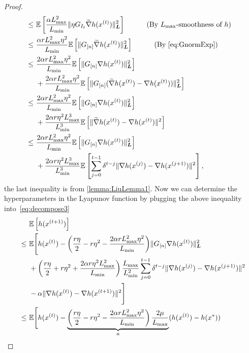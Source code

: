 \begin{proof}
\begin{align*}
        ~\leq~&  \mathbb{E} \left[ \frac{\alpha L_{\max}^2}{L_{\min}} \| \eta G_{I_t} \widetilde{\nabla} h( x^{(t)} )  \|_{\boldsymbol{L}}^2 \right]  \qquad \hbox{\quad(By $L_{\max}$-smoothness of $h$)\quad}  \\
        ~\leq~& \frac{\alpha r L_{\max}^2 \eta^2}{L_{\min}} \mathbb{E} \left[  \| G_{[n]} \widetilde{\nabla} h( x^{(t)} )  \|_{\boldsymbol{L}}^2 \right] \qquad \hbox{\quad(By \eqref{eq:GnormExp})\quad} \\
        ~\leq~&  \frac{2 \alpha r L_{\max}^2 \eta^2}{L_{\min}} \mathbb{E} \left[ \| G_{[n]} \nabla h( x^{(t)} ) \|^2_{\boldsymbol{L}} \right] \\
        &+ \frac{2 \alpha r L_{\max}^2 \eta^2}{L_{\min}} \mathbb{E} \left[  \| G_{[n]} ( \widetilde{\nabla} h( x^{(t)} ) - \nabla h( x^{(t)} ) ) \|^2_{\boldsymbol{L}}  \right] \\
        ~\leq~&  \frac{2 \alpha r L_{\max}^2 \eta^2}{L_{\min}} \mathbb{E} \left[ \| G_{[n]} \nabla h( x^{(t)} ) \|^2_{\boldsymbol{L}} \right] \\
        &+ \frac{2 \alpha r \eta^2 L_{\max}^3}{ L_{\min}^3 } \mathbb{E} \left[  \| \widetilde{\nabla} h( x^{(t)} ) - \nabla h( x^{(t)} ) \|^2  \right] \\
        ~\leq~& \frac{2 \alpha r L_{\max}^2 \eta^2}{L_{\min}} \mathbb{E} \left[ \| G_{[n]} \nabla h( x^{(t)} ) \|^2_{\boldsymbol{L}} \right] \\
        &+ \frac{2 \alpha r \eta^2 L_{\max}^3 }{ L_{\min}^3 }  \mathbb{E} \left[ \sum_{j=0}^{t-1} \delta^{t-j} \| \nabla h(x^{(j)}) - {\nabla} h(x^{(j+1)}) \|^2 \right],
    \end{align*}
    the last inequality is from \autoref{lemma:LiuLemma1}.
    Now we can determine the hyperparameters in the Lyapunov function by plugging the above inequality into~\eqref{eq:decompose3} 
    \begin{equation} \label{eq:recursion}
    \begin{split}
        &\mE\left[ h(x^{(t+1)}) \right] \\
        ~\leq~& \mE\Bigg[ h(x^{(t)}) - {\left( \frac{r \eta }{2} - r \eta^2 - \frac{2 \alpha r L_{\max}^2 \eta^2}{L_{\min}} \right)} \| G_{[n]} \nabla h(x^{(t)}) \|_{\bL}^2  \\
        &+ \left( \frac{r \eta}{2} + r \eta^2 + \frac{2 \alpha r \eta^2 L_{\max}^2}{ L_{\min} } \right) \frac{L_{\max}}{L_{\min}^2} \sum_{j=0}^{t-1} \delta^{t-j} \| \nabla h(x^{(j)}) - {\nabla} h(x^{(j+1)}) \|^2 \\
        &- \alpha \| \nabla h(x^{(t)}) - {\nabla} h(x^{(t+1)}) \|^2 \Bigg]  \\
        ~\leq~& \mE\Bigg[ h(x^{(t)}) - \underbrace{\left( \frac{r \eta }{2} - r \eta^2 - \frac{2 \alpha r L_{\max}^2 \eta^2}{L_{\min}} \right) \frac{2\mu}{ L_{\max}} }_{\kappa} ( h(x^{(t)}) - h(x^*) )  \\

\end{split}
\end{equation}
\end{proof}
